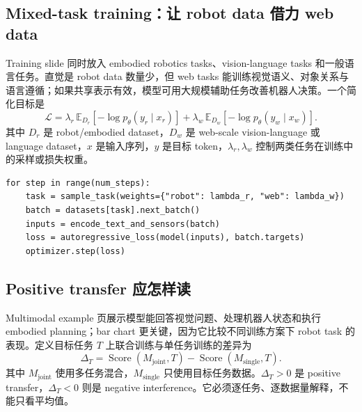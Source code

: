 \subsection{Mixed-task training：让 robot data 借力 web data}

Training slide 同时放入 embodied robotics tasks、vision-language tasks 和一般语言任务。直觉是 robot data 数量少，但 web tasks 能训练视觉语义、对象关系与语言遵循；如果共享表示有效，模型可用大规模辅助任务改善机器人决策。一个简化目标是
$$
\mathcal{L}=\lambda_r\,\mathbb{E}_{D_r}\!\left[-\log p_\theta(y_r\mid x_r)\right]
+\lambda_w\,\mathbb{E}_{D_w}\!\left[-\log p_\theta(y_w\mid x_w)\right].
$$
其中 $D_r$ 是 robot/embodied dataset，$D_w$ 是 web-scale vision-language 或 language dataset，$x$ 是输入序列，$y$ 是目标 token，$\lambda_r,\lambda_w$ 控制两类任务在训练中的采样或损失权重。



\begin{lstlisting}[caption={多任务训练采样器的概念伪代码}]
for step in range(num_steps):
    task = sample_task(weights={"robot": lambda_r, "web": lambda_w})
    batch = datasets[task].next_batch()
    inputs = encode_text_and_sensors(batch)
    loss = autoregressive_loss(model(inputs), batch.targets)
    optimizer.step(loss)
\end{lstlisting}


\subsection{Positive transfer 应怎样读}

Multimodal example 页展示模型能回答视觉问题、处理机器人状态和执行 embodied planning；bar chart 更关键，因为它比较不同训练方案下 robot task 的表现。定义目标任务 $T$ 上联合训练与单任务训练的差异为
$$
\Delta_T=\operatorname{Score}(M_{\text{joint}},T)-\operatorname{Score}(M_{\text{single}},T).
$$
其中 $M_{\text{joint}}$ 使用多任务混合，$M_{\text{single}}$ 只使用目标任务数据。$\Delta_T>0$ 是 positive transfer，$\Delta_T<0$ 则是 negative interference。它必须逐任务、逐数据量解释，不能只看平均值。

